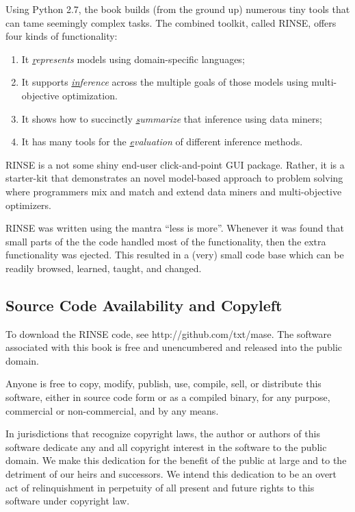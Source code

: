 \documentclass[9pt,twocolumn]{article}
\newcommand{\be}{\begin{enumerate}}
\newcommand{\ee}{\end{enumerate}}
\begin{document}
  Using Python 2.7, the book builds (from the ground up) numerous
  tiny tools that can tame seemingly complex
  tasks. The combined toolkit, called RINSE, offers four kinds of functionality:
  \be
  \item
    It {\em \underline{r}epresents}  models using domain-specific languages;
    \item It supports
    {\em \underline{in}ference} across the multiple goals of those models using multi-objective optimization.
    \item It shows how to succinctly {\em \underline{s}ummarize} that inference  using data miners;
    \item It has  many tools for the
   {\em \underline{e}valuation} of different inference methods. 
   \ee
   
   RINSE is a not some shiny  end-user click-and-point GUI package.
   Rather, it is a starter-kit that demonstrates an novel  model-based approach to problem solving where programmers
   mix and match and extend data miners and multi-objective optimizers.

   RINSE was written using the mantra ``less is more''. Whenever it was found that small parts of the
   the code handled most 
   of the functionality, then the extra functionality was ejected. This resulted in a (very) small code base
   which can be readily browsed, learned, taught, and changed.
   \vfill


   
\subsection*{Source Code Availability and Copyleft}
To download the RINSE code, see http://github.com/txt/mase.
The software associated with this book
is free and unencumbered and released into the public domain. 

Anyone is free to copy, modify, publish, use, compile, sell, or
distribute this software, either in source code form or as a compiled
binary, for any purpose, commercial or non-commercial, and by any
means.

In jurisdictions that recognize copyright laws, the author or authors
of this software dedicate any and all copyright interest in the
software to the public domain. We make this dedication for the benefit
of the public at large and to the detriment of our heirs and
successors. We intend this dedication to be an overt act of
relinquishment in perpetuity of all present and future rights to this
software under copyright law.
\end{document}
